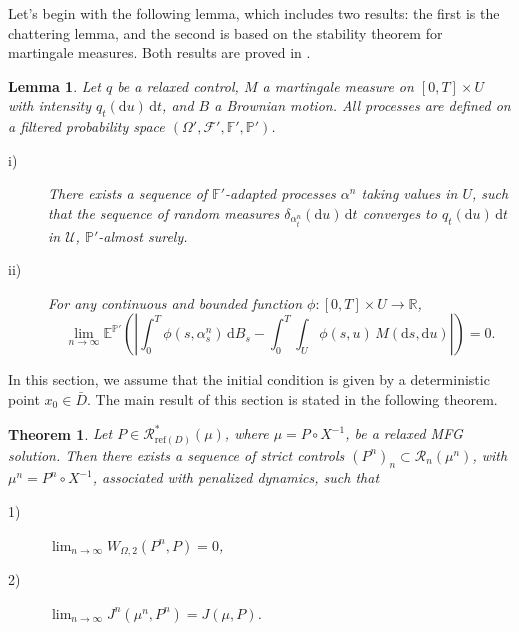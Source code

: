 \documentclass[11pt,amsfonts]{article}
\theoremstyle{plain}
\newtheorem{theorem}{Theorem}
\newtheorem{lemma}{Lemma}
\theoremstyle{assumpstyle}
\numberwithin{equation}{section}
\numberwithin{theorem}{section}
\numberwithin{proposition}{section}
\numberwithin{definition}{section}
\numberwithin{remark}{section}
\numberwithin{corollary}{section}
\numberwithin{lemma}{section}
\begin{document}
Let’s begin with the following lemma, which includes two results: the first is the chattering lemma, and the second is based on the stability theorem for martingale measures. Both results are proved in \cite[p.~196]{meleard}.
\begin{lemma}\label{chattering lemma}
Let $q$ be a relaxed control, $M$ a martingale measure on $[0, T] \times U$ with intensity $q_t(\mathrm{d}u)\,\mathrm{d}t$, and $B$ a Brownian motion. All processes are defined on a filtered probability space $(\Omega', \mathcal{F}', \mathbb{F}', \mathbb{P}')$.
\begin{description}
    \item[i)] There exists a sequence of $\mathbb{F}'$-adapted processes $\alpha^n$ taking values in $U$, such that the sequence of random measures $\delta_{\alpha^n_t}(\mathrm{d}u)\, \mathrm{d}t$ converges to $q_t(\mathrm{d}u)\,\mathrm{d}t$ in $\mathcal{U}$, $\mathbb{P}'$-almost surely.
    \item[ii)] For any continuous and bounded function $\phi: [0, T] \times U \to \mathbb{R}$,
    \begin{equation*}
        \lim_{n \to \infty} \mathbb{E}^{\mathbb{P}'}\left( \left| \int_0^T \phi(s, \alpha^n_s)\, \mathrm{d}B_s - \int_0^T \int_U \phi(s, u)\,M(\mathrm{d}s, \mathrm{d}u) \right| \right) = 0.
    \end{equation*}
\end{description}
\end{lemma}
In this section, we assume that the initial condition is given by a deterministic point $x_0 \in \bar{D}$. 
The main result of this section is stated in the following theorem.
\begin{theorem} \label{stric-Non refle-equi relaxed}
Let $P \in \mathcal{R}^*_{\mathrm{ref}(D)}(\mu)$, where $\mu = P \circ X^{-1}$, be a relaxed MFG solution. 
Then there exists a sequence of strict controls $(P^n)_n \subset \mathcal{R}_n(\mu^n)$, with $\mu^n = P^n \circ X^{-1}$, associated with penalized dynamics, such that
\begin{description}
    \item[1)] $ \lim_{n \to \infty} W_{\Omega,2}(P^n, P) = 0 $,
    \item[2)] $\lim_{n \to \infty} J^n(\mu^n, P^n) =J(\mu, P)$.
\end{description}
\end{theorem}
\end{document}
